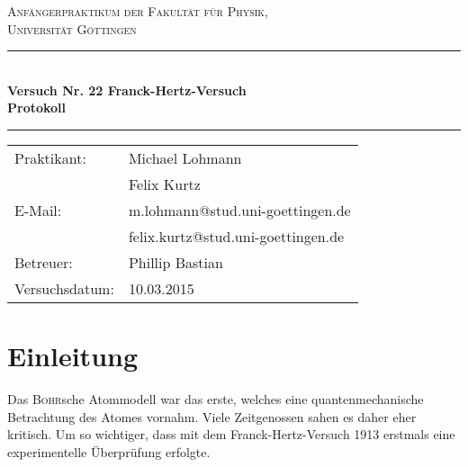 \documentclass[12pt,a4paper,titlepage,headinclude,bibtotoc]{scrartcl}
\begin{document}
\begin{titlepage}
\centering
\textsc{\Large Anfängerpraktikum der Fakultät für
  Physik,\\[1.5ex] Universität Göttingen}

\vspace*{3.2cm}

\rule{\textwidth}{1pt}\\[0.5cm]
{\huge \bfseries
  Versuch Nr. 22 Franck-Hertz-Versuch\\[1.5ex]
  Protokoll}\\[0.5cm]
\rule{\textwidth}{1pt}

\vspace*{2.5cm}

\begin{Large}
\begin{tabular}{ll}
Praktikant: &  Michael Lohmann\\
 &  Felix Kurtz\\
 E-Mail: & m.lohmann@stud.uni-goettingen.de\\
 &  felix.kurtz@stud.uni-goettingen.de\\
 Betreuer: & Phillip Bastian\\
 Versuchsdatum: & 10.03.2015\\
\end{tabular}
\end{Large}

\vspace*{0.8cm}

\begin{Large}
\end{Large}

\end{titlepage}

\tableofcontents

\newpage

\section{Einleitung}
\label{sec:einleitung}
Das \textsc{Bohr}sche Atommodell war das erste, welches eine quantenmechanische Betrachtung des Atomes vornahm.
Viele Zeitgenossen sahen es daher eher kritisch.
Um so wichtiger, dass mit dem Franck-Hertz-Versuch 1913 erstmals eine experimentelle Überprüfung erfolgte.
\cite{lp22}
\end{document}

